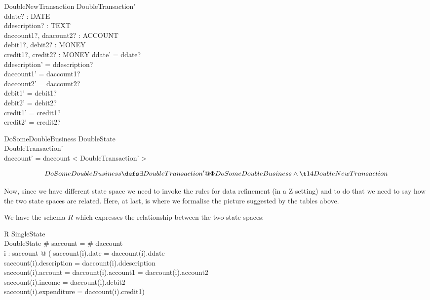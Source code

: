 \documentclass[11pt]{amsart}
\begin{document}
\begin{schema}{DoubleNewTransaction}
DoubleTransaction'\\
ddate? : DATE\\
ddescription? : TEXT\\
daccount1?, daacount2? : ACCOUNT\\ 
debit1?, debit2? : MONEY\\
credit1?, credit2? : MONEY
\where
ddate' = ddate?\\
ddescription' = ddescription?\\
daccount1' = daccount1?\\
daccount2' = daccount2?\\
debit1' = debit1?\\
debit2' = debit2?\\
credit1' = credit1?\\
credit2' = credit2?
\end{schema}

\begin{schema}{\Phi DoSomeDoubleBusiness}
\Delta DoubleState\\
DoubleTransaction'\\
\where
daccount' = daccount \cat < \theta DoubleTransaction' >
\end{schema}

\[
DoSomeDoubleBusiness \defs \exists DoubleTransaction' @ \Phi DoSomeDoubleBusiness \land\\
\t14 DoubleNewTransaction
\]

Now, since we have different state space we need to invoke the rules for data refinement (in a Z setting) and to do that we need to say how the two state spaces are related. Here, at last, is where we formalise the picture suggested by the tables above.

We have the schema $R$ which expresses the relationship between the two state spaces:

\begin{schema}{R}
SingleState\\
DoubleState
\where
\# saccount = \# daccount\\
\forall i : \dom saccount @ (
saccount(i).date = daccount(i).ddate \land\\
saccount(i).description = daccount(i).ddescription \land\\
saccount(i).account = daccount(i).account1 = daccount(i).account2 \land\\
saccount(i).income = daccount(i).debit2 \land\\
saccount(i).expenditure = daccount(i).credit1)
\end{schema}
\end{document}

